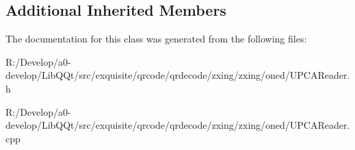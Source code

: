 \subsection*{Additional Inherited Members}


The documentation for this class was generated from the following files\+:\begin{DoxyCompactItemize}
\item 
R\+:/\+Develop/a0-\/develop/\+Lib\+Q\+Qt/src/exquisite/qrcode/qrdecode/zxing/zxing/oned/U\+P\+C\+A\+Reader.\+h\item 
R\+:/\+Develop/a0-\/develop/\+Lib\+Q\+Qt/src/exquisite/qrcode/qrdecode/zxing/zxing/oned/U\+P\+C\+A\+Reader.\+cpp\end{DoxyCompactItemize}
